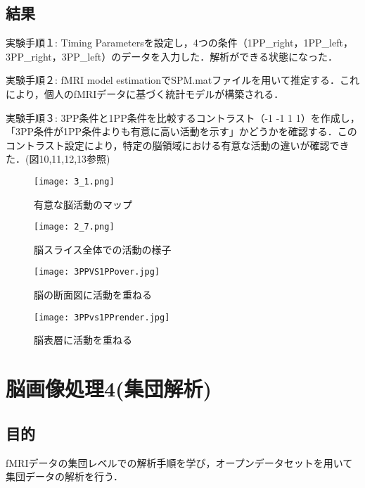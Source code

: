 \documentclass{jlreq}
\begin{document}
\subsection{結果}
実験手順１: Timing Parametersを設定し，4つの条件（1PP\_right，1PP\_left，3PP\_right，3PP\_left）のデータを入力した．解析ができる状態になった．

実験手順２: fMRI model estimationでSPM.matファイルを用いて推定する．これにより，個人のfMRIデータに基づく統計モデルが構築される．

実験手順３: 3PP条件と1PP条件を比較するコントラスト（-1 -1 1 1）を作成し，「3PP条件が1PP条件よりも有意に高い活動を示す」かどうかを確認する．このコントラスト設定により，特定の脳領域における有意な活動の違いが確認できた．(図10,11,12,13参照)

\begin{figure}[H]
    \centering
        \begin{minipage}{0.45\textwidth}
        \centering
        \texttt{[image: 3\_1.png]}
        \caption{有意な脳活動のマップ}
        \label{fig:brain_T1}
    \end{minipage}
    \hfill
    \begin{minipage}{0.45\textwidth}
        \centering
        \texttt{[image: 2\_7.png]}
        \caption{脳スライス全体での活動の様子}
        \label{fig:brain_T1}
    \end{minipage}
    \hfill
\end{figure}

\begin{figure}[H]
    \centering
        \begin{minipage}{0.45\textwidth}
        \centering
        \texttt{[image: 3PPVS1PPover.jpg]}
        \caption{脳の断面図に活動を重ねる}
        \label{fig:brain_T1}
    \end{minipage}
    \hfill
    \begin{minipage}{0.45\textwidth}
        \centering
        \texttt{[image: 3PPvs1PPrender.jpg]}
        \caption{脳表層に活動を重ねる}
        \label{fig:brain_T1}
    \end{minipage}
    \hfill
\end{figure}

\section{脳画像処理4(集団解析)}
\subsection{目的}
fMRIデータの集団レベルでの解析手順を学び，オープンデータセットを用いて集団データの解析を行う．
\end{document}
